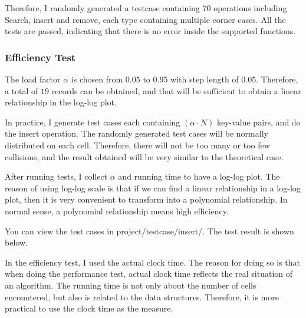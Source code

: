 \documentclass{article}
\begin{document}
\begin{spacing}{1.2}
Therefore, I randomly generated a testcase containing 70 operations including Search, insert and remove, each type containing multiple corner cases. All the tests are passed, indicating that there is no error inside the supported functions.

\subsubsection{Efficiency Test}
The load factor $\alpha$ is chosen from $0.05$ to $0.95$ with step length of $0.05$. Therefore, a total of $19$ records can be obtained, and that will be sufficient to obtain a linear relationship in the log-log plot.

In practice, I generate test cases each containing $(\alpha\cdot N)$ key-value pairs, and do the insert operation. The randomly generated test cases will be normally distributed on each cell. Therefore, there will not be too many or too few collisions, and the result obtained will be very similar to the theoretical case. 

After running tests, I collect $\alpha$ and running time to have a log-log plot. The reason of using log-log scale is that if we can find a linear relationship in a log-log plot, then it is very convenient to transform into a polynomial relationship. In normal sense, a polynomial relationship means high efficiency.

You can view the test cases in project/testcase/insert/. The test result is shown below.

In the efficiency test, I used the actual clock time. The reason for doing so is that when doing the performance test, actual clock time reflects the real situation of an algorithm. The running time is not only about the number of cells encountered, but also is related to the data structures. Therefore, it is more practical to use the clock time as the measure.


\end{spacing}
\end{document}
